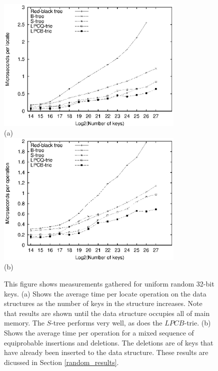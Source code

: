 \documentclass[]{acmtrans2m}
\begin{document}
\begin{figure}
\center
\includegraphics[width=0.8\textwidth]{plots/knuth_locate_time.eps}\\
(a)\\
\includegraphics[width=0.8\textwidth]{plots/knuth_drandom_time.eps}\\
(b)
\caption{This figure shows measurements gathered for uniform random 32-bit keys.
(a) Shows the average time per locate operation
on the data structures as the number of keys in the structure increases. Note that results
are shown until the data structure occupies all of main memory. The $S$-tree performs very well, as does the $LPCB$-trie.
(b) Shows the average time per operation for a mixed sequence of equiprobable insertions and deletions. The deletions
are of keys that have already been inserted to the data structure.
These results are dicussed in Section \ref{random_results}.}
\label{knuth_locate_delete_time_fig}
\end{figure}
\end{document}

